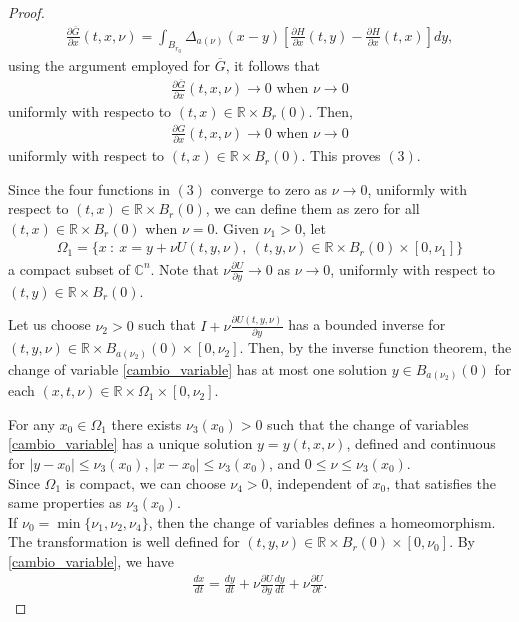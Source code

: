\documentclass[english,reqno]{amsart}
\numberwithin{equation}{section}
\theoremstyle{plain}
\theoremstyle{definition}
\theoremstyle{remark}
\newcommand{\bb}[1]{{\mathbb{#1}}}
\begin{document}
\begin{proof}
\begin{eqnarray*}
\frac{\partial\overline{G}}{\partial x}(t,x,\nu)=\int_{B_{r_0}} \Delta_{a(\nu)}(x-y)[\frac{\partial H}{\partial x}(t,y)-\frac{\partial H}{\partial x}(t,x)]dy,
\end{eqnarray*}
using the argument employed for $\overline{G}$, it follows that
\begin{eqnarray*}
\frac{\partial\overline{G}}{\partial x}(t,x,\nu)\rightarrow 0 \mbox{  when } \nu\rightarrow 0
\end{eqnarray*}
uniformly with respecto to $(t,x)\in\bb{R}\times B_{r}(0)$. Then,
\begin{eqnarray*}
\frac{\partial G}{\partial x}(t,x,\nu)\rightarrow 0 \mbox{  when } \nu\rightarrow 0
\end{eqnarray*}
uniformly with respect to $(t,x)\in\bb{R}\times B_{r}(0)$. This proves $(3)$.

Since the four functions in $(3)$ converge to zero as $\nu\rightarrow 0$, uniformly with respect to $(t,x)\in\mathbb{R}\times B_{r}(0)$, we can define them as zero for all $(t,x)\in\mathbb{R}\times B_{r}(0)$ when $\nu=0$. Given $\nu_1>0$, let 
\begin{eqnarray*}
\Omega_1 = \{ x\ :\  x=y+\nu U(t,y,\nu),\ (t,y,\nu) \in \bb{R} \times B_{r}(0) \times [0,\nu_1] \}
\end{eqnarray*}
a compact subset of $\bb{C}^n$. Note that $\nu \frac{\partial U }{\partial y}\rightarrow 0$ as $\nu\rightarrow 0$, uniformly with respect to $(t,y)\in\mathbb{R}\times B_{r}(0)$.

Let us choose $\nu_2>0$ such that $I+\nu\frac{\partial U (t,y,\nu)}{\partial y}$ has a bounded inverse for $(t,y,\nu)\in\mathbb{R}\times B_{a(\nu_2)}(0)\times[0,\nu_2]$.  
Then, by the inverse function theorem, the change of variable \eqref{cambio_variable} has at most one solution $y\in B_{a(\nu_2)}(0)$ for each $(x,t,\nu)\in \mathbb{R}\times \Omega_1 \times [0,\nu_2]$.

For any $x_{0}\in\Omega_{1}$ there exists $\nu_{3}(x_{0})>0$ such that the change of variables \eqref{cambio_variable} has a unique solution $y=y(t,x,\nu)$, defined and continuous for $\lvert y-x_{0}\rvert\le \nu_{3}(x_{0})$, $\lvert x-x_{0}\rvert\le \nu_{3}(x_{0})$, and $0\le \nu\le \nu_{3}(x_{0})$.\\
Since $\Omega_{1}$ is compact, we can choose $\nu_{4}>0$, independent of $x_{0}$, that satisfies the same properties as $\nu_{3}(x_{0})$.\\
If $\nu_{0}=\min\{\nu_{1},\nu_{2},\nu_{4}\}$, then the change of variables defines a homeomorphism. The transformation is well defined for $(t,y,\nu)\in\bb{R}\times B_{r}(0)\times[0,\nu_{0}]$.
By \eqref{cambio_variable}, we have
\begin{eqnarray*}
\frac{dx}{dt}=\frac{dy}{dt}+\nu \frac{\partial U}{\partial y}\frac{dy}{dt}+\nu\frac{\partial U}{\partial t}.
\end{eqnarray*}


\end{proof}
\end{document}
